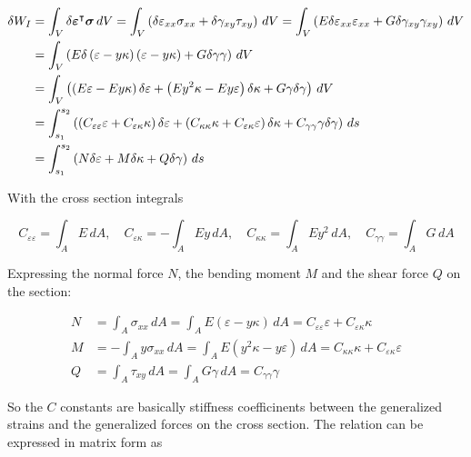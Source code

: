 \begin{align}
\delta W_{I} &= \int_{V} \delta\boldsymbol{\varepsilon}^\intercal\boldsymbol{\sigma}\,dV = \int_{V}\left(\delta\varepsilon_{xx}\sigma_{xx} + \delta\gamma_{xy}\tau_{xy}\right)\,dV = \int_{V}\left(E\delta\varepsilon_{xx}\varepsilon_{xx} + G\delta\gamma_{xy}\gamma_{xy}\right)\,dV \notag \\
&= \int_{V}\left(E\delta\left(\varepsilon - y\kappa\right)\left(\varepsilon - y\kappa\right) + G\delta\gamma\gamma \right)\,dV \notag \\
&= \int_{V}\left( \left(E\varepsilon - Ey\kappa\right)\delta\varepsilon + \left(Ey^2\kappa - Ey\varepsilon\right)\delta\kappa + G\gamma\delta\gamma \right)\,dV \notag \\
&= \int_{s_1}^{s_2}\left( \left(C_{\varepsilon\varepsilon}\varepsilon + C_{\varepsilon\kappa}\kappa\right)\delta\varepsilon + \left(C_{\kappa\kappa}\kappa + C_{\varepsilon\kappa}\varepsilon\right)\delta\kappa + C_{\gamma\gamma}\gamma\delta\gamma \right)\,ds \\
&= \int_{s_1}^{s_2}\left( N\delta\varepsilon + M\delta\kappa + Q\delta\gamma \right)\,ds
\end{align}

With the cross section integrals

\begin{equation}
C_{\varepsilon\varepsilon} = \int_{A} E\,dA, \quad C_{\varepsilon\kappa} = -\int_{A} Ey\,dA, \quad C_{\kappa\kappa} = \int_{A} Ey^2\,dA, \quad C_{\gamma\gamma} = \int_{A} G\,dA
\end{equation}

Expressing the normal force $N$, the bending moment $M$ and the shear force $Q$ on the section:

\begin{align}
N &= \int_{A} \sigma_{xx}\,dA = \int_{A} E(\varepsilon - y\kappa)\,dA = C_{\varepsilon\varepsilon}\varepsilon + C_{\varepsilon\kappa}\kappa \\
M &= -\int_{A} y\sigma_{xx}\,dA = \int_{A} E(y^2\kappa - y\varepsilon)\,dA = C_{\kappa\kappa}\kappa + C_{\varepsilon\kappa}\varepsilon \\
Q &= \int_{A} \tau_{xy}\,dA = \int_{A} G\gamma\,dA = C_{\gamma\gamma}\gamma
\end{align}

So the $C$ constants are basically stiffness coefficinents between the generalized strains and the generalized forces on the cross section.
The relation can be expressed in matrix form as

